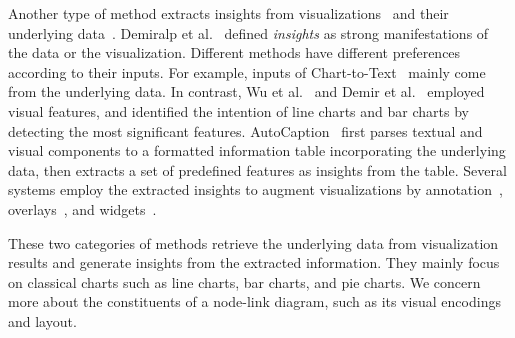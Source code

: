 Another type of method extracts insights from visualizations~\cite{DBLP:conf/diagrams/WuCEC10, DBLP:journals/nrhm/DemirOSECMC10} and their underlying data~\cite{DBLP:conf/inlg/ObeidH20, DBLP:journals/ivs/CuiBYE19}.
Demiralp et al.~\cite{DBLP:journals/pvldb/DemiralpHPP17} defined \textit{insights} as strong manifestations of the data or the visualization.
Different methods have different preferences according to their inputs.
For example, inputs of Chart-to-Text~\cite{DBLP:conf/inlg/ObeidH20} mainly come from the underlying data.
In contrast, Wu et al.~\cite{DBLP:conf/diagrams/WuCEC10} and Demir et al.~\cite{DBLP:journals/nrhm/DemirOSECMC10} employed visual features,
and identified the intention of line charts and bar charts by detecting the most significant features.
AutoCaption~\cite{DBLP:conf/apvis/LiuXHWY20} first parses textual and visual components to a formatted information table incorporating the underlying data,
then extracts a set of predefined features as insights from the table.
Several systems employ the extracted insights to augment visualizations by annotation~\cite{DBLP:conf/ieeevast/Kandogan12, DBLP:journals/tvcg/BryanMW17}, overlays~\cite{DBLP:journals/tvcg/KongA12},  and widgets~\cite{DBLP:journals/tvcg/SrinivasanDES19}.

These two categories of methods retrieve the underlying data from visualization results and generate insights from the extracted information. 
They mainly focus on classical charts such as line charts, bar charts, and pie charts.
We concern more about the constituents of a node-link diagram, such as its visual encodings and layout.


